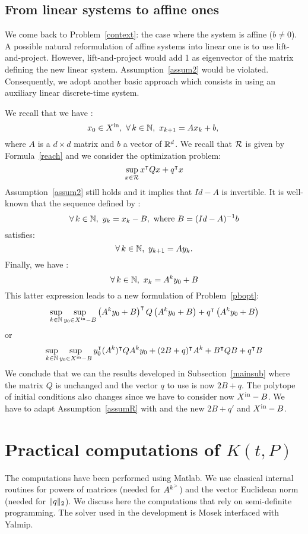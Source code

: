 \documentclass[10pt]{article}
\begin{document}
\subsection{From linear systems to affine ones}
\label{affine}
We come back to Problem~\eqref{context}: the case where the system is affine ($b\neq 0$).
A possible natural reformulation of affine systems into linear one is to use lift-and-project. However, lift-and-project would add 1 as eigenvector of the matrix defining the new linear system. Assumption~\ref{assum2} would be violated.  Consequently, we adopt another basic approach which consists in using an auxiliary linear discrete-time system.   

 We recall that we have :
\[
x_0\in \xin,\ \forall\, k\in\nn,\ x_{k+1}=A x_k+b,\
\]
where $A$ is a $d\times d$ matrix and $b$ a vector of $\mathbb R^d$. We recall that $\mathcal{R}$ is given by Formula~\eqref{reach} and we consider the optimization problem:
\[
\sup_{x\in\mathcal{R}} x^\intercal Q x+q^\intercal x
\]
Assumption~\ref{assum2} still holds and it implies that $Id-A$ is invertible. It is well-known that the sequence defined by :
\[
\forall\, k\in\mathbb{N},\ y_k=x_k-B,\text{ where } B=(Id-A)^{-1} b
\]
satisfies:
\[
\forall\, k\in\mathbb{N},\ y_{k+1}=A y_k. 
\]
Finally, we have :
\[
\forall\, k\in\nn,\ x_k=A^k y_0+B
\]
This latter expression leads to a new formulation of Problem~\eqref{pbopt}: 
\[
\sup_{k\in\mathbb{N}} \sup_{y_0\in X^\mathrm{in}-B} \left(A^k y_0+B\right)^\intercal Q  \left(A^k y_0+B\right)+q^\intercal  \left(A^k y_0+B\right)
\]
or
\[
\sup_{k\in\mathbb{N}} \sup_{y_0\in X^\mathrm{in}-B} y_0^\intercal (A^k)^\intercal Q  A^k y_0+(2B+q)^\intercal A^k +B^\intercal Q B+q^\intercal B
\]
We conclude that we can the results developed in Subsection~\ref{mainsub} where the matrix $Q$ is unchanged and the vector $q$ to use is now $2B+q$. The polytope of initial conditions also changes since we have to consider now $X^\mathrm{in}-B$. We have to adapt Assumption~\ref{assumR} with  and the new  $2B+q'$ and $X^\mathrm{in}-B$.

\section{Practical computations of $K(t,P)$}
\label{computations}
The computations have been performed using Matlab. We use classical internal routines for powers of matrices  (needed for $A^{k^{>}}$) and  the vector Euclidean norm (needed for $\| q\|_2$). We discuss here the computations that rely on semi-definite programming. The solver used in the development is Mosek interfaced with Yalmip. 
\end{document}
